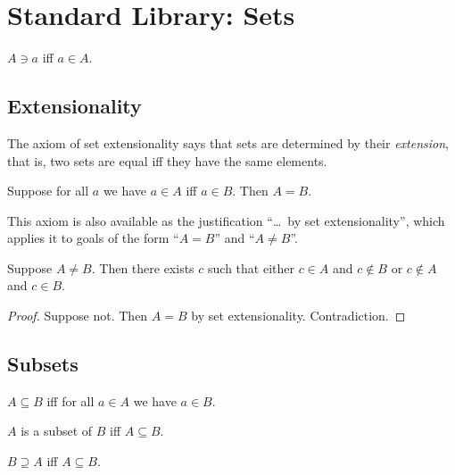
\section{Standard Library: Sets}

\begin{abbreviation}\label{ni}
    $A\ni a$ iff $a\in A$.
\end{abbreviation}

\subsection{Extensionality}

The axiom of set extensionality says that sets are determined by their \textit{extension},
that is, two sets are equal iff they have the same elements.
%
\begin{axiom}\label{setext}
    Suppose for all $a$ we have $a\in A$ iff $a\in B$.
    Then $A = B$.
\end{axiom}

This axiom is also available as the justification “{\ldots\ by set extensionality}”,
which applies it to goals of the form “$A = B$” and  “$A \neq B$”.

\begin{proposition}%
\label{neq_witness}
    Suppose $A\neq B$.
    Then there exists $c$ such that
    either $c\in A$ and $c\not\in B$
    or $c\not\in A$ and $c\in B$.
\end{proposition}
\begin{proof}
    Suppose not. Then $A = B$ by set extensionality. Contradiction.
\end{proof}


\subsection{Subsets}

\begin{definition}\label{subseteq}
    $A\subseteq B$ iff
    for all $a\in A$ we have $a\in B$.
\end{definition}

\begin{abbreviation}\label{is_subset}
    $A$ is a subset of $B$ iff $A\subseteq B$.
\end{abbreviation}

\begin{abbreviation}\label{supseteq}
    $B\supseteq A$ iff $A\subseteq B$.
\end{abbreviation}

